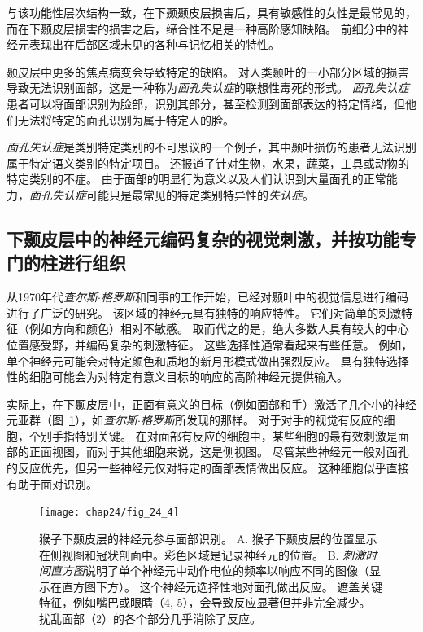 与该功能性层次结构一致，在下颞颞皮层损害后，具有敏感性的女性是最常见的，而在下颞皮层损害的损害之后，缔合性不足是一种高阶感知缺陷。
前细分中的神经元表现出在后部区域未见的各种与记忆相关的特性。


颞皮层中更多的焦点病变会导致特定的缺陷。
对人类颞叶的一小部分区域的损害导致无法识别面部，这是一种称为\textit{面孔失认症}的联想性毒死的形式。
\textit{面孔失认症}患者可以将面部识别为脸部，识别其部分，甚至检测到面部表达的特定情绪，但他们无法将特定的面孔识别为属于特定人的脸。


\textit{面孔失认症}是类别特定类别的不可思议的一个例子，其中颞叶损伤的患者无法识别属于特定语义类别的特定项目。
还报道了针对生物，水果，蔬菜，工具或动物的特定类别的不症。
由于面部的明显行为意义以及人们认识到大量面孔的正常能力，\textit{面孔失认症}可能只是最常见的特定类别特异性的\textit{失认症}。



\subsection{下颞皮层中的神经元编码复杂的视觉刺激，并按功能专门的柱进行组织}

从1970年代\textit{查尔斯$\cdot$格罗斯}和同事的工作开始，已经对颞叶中的视觉信息进行编码进行了广泛的研究。
该区域的神经元具有独特的响应特性。
它们对简单的刺激特征（例如方向和颜色）相对不敏感。 
取而代之的是，绝大多数人具有较大的中心位置感受野，并编码复杂的刺激特征。
这些选择性通常看起来有些任意。
例如，单个神经元可能会对特定颜色和质地的新月形模式做出强烈反应。
具有独特选择性的细胞可能会为对特定有意义目标的响应的高阶神经元提供输入。


实际上，在下颞皮层中，正面有意义的目标（例如面部和手）激活了几个小的神经元亚群（图~\ref{fig:24_4}），如\textit{查尔斯$\cdot$格罗斯}所发现的那样。
对于对手的视觉有反应的细胞，个别手指特别关键。
在对面部有反应的细胞中，某些细胞的最有效刺激是面部的正面视图，而对于其他细胞来说，这是侧视图。
尽管某些神经元一般对面孔的反应优先，但另一些神经元仅对特定的面部表情做出反应。
这种细胞似乎直接有助于面对识别。


\begin{figure}[htbp]
	\centering
	\texttt{[image: chap24/fig\_24\_4]}
	\caption{猴子下颞皮层的神经元参与面部识别。
		A. 猴子下颞皮层的位置显示在侧视图和冠状剖面中。彩色区域是记录神经元的位置。 
		B. \textit{刺激时间直方图}说明了单个神经元中动作电位的频率以响应不同的图像（显示在直方图下方）。
		这个神经元选择性地对面孔做出反应。
		遮盖关键特征，例如嘴巴或眼睛（4, 5），会导致反应显著但并非完全减少。
		扰乱面部（2）的各个部分几乎消除了反应。}
	\label{fig:24_4}
\end{figure}


